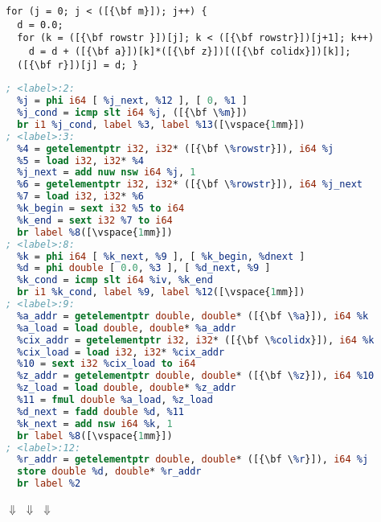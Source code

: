 \centering


\begin{lstlisting}[language=MyCpp]
for (j = 0; j < ([{\bf m}]); j++) {
  d = 0.0;
  for (k = ([{\bf rowstr }])[j]; k < ([{\bf rowstr}])[j+1]; k++)
    d = d + ([{\bf a}])[k]*([{\bf z}])[([{\bf colidx}])[k]];
  ([{\bf r}])[j] = d; }
\end{lstlisting}
\vspace{-3.5mm}
\begin{lstlisting}[language={LLVM}, label={fig:spmvexample1}, caption=
   {Sparse matrix-vector product shown in C at the top, and in LLVM IR at the
    bottom\leftskip=0pt\rightskip=0pt}]
; <label>:2:
  %j = phi i64 [ %j_next, %12 ], [ 0, %1 ]
  %j_cond = icmp slt i64 %j, ([{\bf \%m}])
  br i1 %j_cond, label %3, label %13([\vspace{1mm}])
; <label>:3:
  %4 = getelementptr i32, i32* ([{\bf \%rowstr}]), i64 %j
  %5 = load i32, i32* %4
  %j_next = add nuw nsw i64 %j, 1
  %6 = getelementptr i32, i32* ([{\bf \%rowstr}]), i64 %j_next
  %7 = load i32, i32* %6
  %k_begin = sext i32 %5 to i64
  %k_end = sext i32 %7 to i64
  br label %8([\vspace{1mm}])
; <label>:8:
  %k = phi i64 [ %k_next, %9 ], [ %k_begin, %dnext ]
  %d = phi double [ 0.0, %3 ], [ %d_next, %9 ]
  %k_cond = icmp slt i64 %iv, %k_end
  br i1 %k_cond, label %9, label %12([\vspace{1mm}])
; <label>:9:
  %a_addr = getelementptr double, double* ([{\bf \%a}]), i64 %k
  %a_load = load double, double* %a_addr
  %cix_addr = getelementptr i32, i32* ([{\bf \%colidx}]), i64 %k
  %cix_load = load i32, i32* %cix_addr
  %10 = sext i32 %cix_load to i64
  %z_addr = getelementptr double, double* ([{\bf \%z}]), i64 %10
  %z_load = load double, double* %z_addr
  %11 = fmul double %a_load, %z_load
  %d_next = fadd double %d, %11
  %k_next = add nsw i64 %k, 1
  br label %8([\vspace{1mm}])
; <label>:12:
  %r_addr = getelementptr double, double* ([{\bf \%r}]), i64 %j
  store double %d, double* %r_addr
  br label %2
\end{lstlisting}

\vspace{0.05mm}
{{\Huge$\Downarrow$}
\hspace{-2.73mm}\phantom{\bf~~~Idiom Detection with IDL~~}\hspace{-3.69mm}
{\Huge$\Downarrow$}
\hspace{-2.73mm}\hspace{-3.69mm}
{\Huge$\Downarrow$}}
\hspace{5.1mm}

